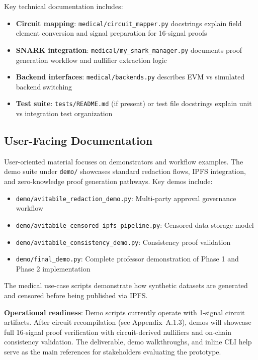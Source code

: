Key technical documentation includes:
\begin{itemize}
    \item \textbf{Circuit mapping}: \texttt{medical/circuit\_mapper.py} docstrings explain field element conversion and signal preparation for 16-signal proofs
    \item \textbf{SNARK integration}: \texttt{medical/my\_snark\_manager.py} documents proof generation workflow and nullifier extraction logic
    \item \textbf{Backend interfaces}: \texttt{medical/backends.py} describes EVM vs simulated backend switching
    \item \textbf{Test suite}: \texttt{tests/README.md} (if present) or test file docstrings explain unit vs integration test organization
\end{itemize}

\subsection{User-Facing Documentation}

User-oriented material focuses on demonstrators and workflow examples. The demo suite under \texttt{demo/} showcases standard redaction flows, IPFS integration, and zero-knowledge proof generation pathways. Key demos include:

\begin{itemize}
    \item \texttt{demo/avitabile\_redaction\_demo.py}: Multi-party approval governance workflow
    \item \texttt{demo/avitabile\_censored\_ipfs\_pipeline.py}: Censored data storage model
    \item \texttt{demo/avitabile\_consistency\_demo.py}: Consistency proof validation
    \item \texttt{demo/final\_demo.py}: Complete professor demonstration of Phase 1 and Phase 2 implementation
\end{itemize}

The medical use-case scripts demonstrate how synthetic datasets are generated and censored before being published via IPFS. 

\textbf{Operational readiness}: Demo scripts currently operate with 1-signal circuit artifacts. After circuit recompilation (see Appendix~A.1.3), demos will showcase full 16-signal proof verification with circuit-derived nullifiers and on-chain consistency validation. The deliverable, demo walkthroughs, and inline CLI help serve as the main references for stakeholders evaluating the prototype.

